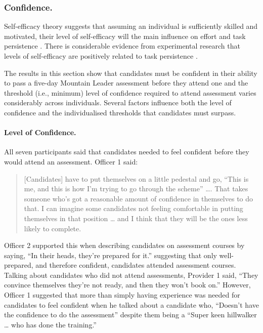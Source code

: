 \documentclass[
  12pt,
  a4paper,
]{book}
\begin{document}
\hypertarget{qual-gta-confidence}{%
\subsubsection{Confidence.}\label{qual-gta-confidence}}

Self-efficacy theory suggests that assuming an individual is sufficiently skilled and motivated, their level of self-efficacy will the main influence on effort and task persistence \citep{Bandura1977, Bandura1982, Bandura1997}. There is considerable evidence from experimental research that levels of self-efficacy are positively related to task persistence \citep[e.g.,][]{Hutchinson2008, Tenenbaum2001, Weinberg1979, Weinberg1980, Weinberg1981}.

The results in this section show that candidates must be confident in their ability to pass a five-day Mountain Leader assessment before they attend one and the threshold (i.e., minimum) level of confidence required to attend assessment varies considerably across individuals. Several factors influence both the level of confidence and the individualised thresholds that candidates must surpass.

\hypertarget{level-of-confidence.}{%
\paragraph{Level of Confidence.}\label{level-of-confidence.}}

All seven participants said that candidates needed to feel confident before they would attend an assessment. Officer 1 said:

\begin{quote}
{[}Candidates{]} have to put themselves on a little pedestal and go, ``This is me, and this is how I'm trying to go through the scheme'' \ldots. That takes someone who's got a reasonable amount of confidence in themselves to do that. I can imagine some candidates not feeling comfortable in putting themselves in that position \ldots{} and I think that they will be the ones less likely to complete.
\end{quote}

Officer 2 supported this when describing candidates on assessment courses by saying, ``In their heads, they're prepared for it.'' suggesting that only well-prepared, and therefore confident, candidates attended assessment courses. Talking about candidates who did not attend assessments, Provider 1 said, ``They convince themselves they're not ready, and then they won't book on.'' However, Officer 1 suggested that more than simply having experience was needed for candidates to feel confident when he talked about a candidate who, ``Doesn't have the confidence to do the assessment'' despite them being a ``Super keen hillwalker \ldots{} who has done the training.''
\end{document}
